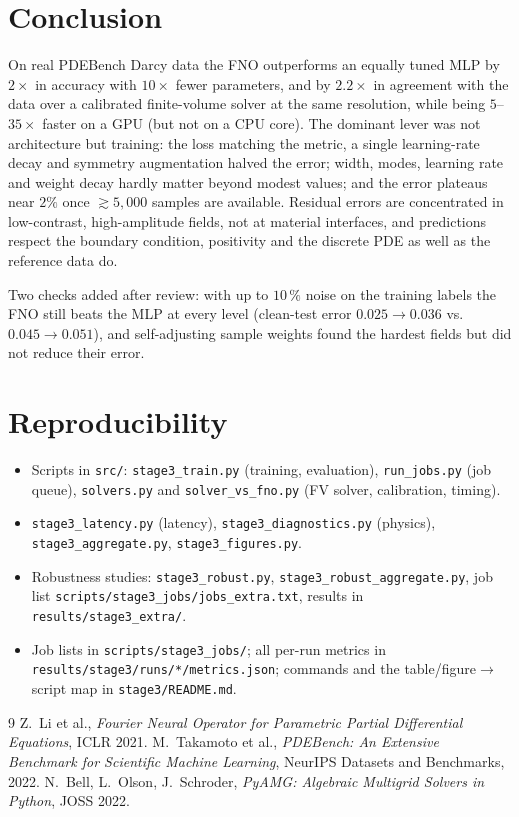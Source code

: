 \documentclass[11pt,a4paper]{article}
\begin{document}
\section{Conclusion}
On real PDEBench Darcy data the FNO outperforms an equally tuned MLP by $2\times$ in accuracy with $10\times$ fewer parameters, and by $2.2\times$ in agreement with the data over a calibrated finite-volume solver at the same resolution, while being $5$--$35\times$ faster on a GPU (but not on a CPU core). The dominant lever was not architecture but training: the loss matching the metric, a single learning-rate decay and symmetry augmentation halved the error; width, modes, learning rate and weight decay hardly matter beyond modest values; and the error plateaus near $2\%$ once $\gtrsim5{,}000$ samples are available. Residual errors are concentrated in low-contrast, high-amplitude fields, not at material interfaces, and predictions respect the boundary condition, positivity and the discrete PDE as well as the reference data do.

Two checks added after review: with up to $10\,\%$ noise on the training labels the FNO still beats the MLP at every level (clean-test error $0.025\to0.036$ vs.\ $0.045\to0.051$), and self-adjusting sample weights found the hardest fields but did not reduce their error.

\section*{Reproducibility}
\begin{itemize}
\item Scripts in \texttt{src/}: \texttt{stage3\_train.py} (training, evaluation), \texttt{run\_jobs.py} (job queue), \texttt{solvers.py} and \texttt{solver\_vs\_fno.py} (FV solver, calibration, timing).
\item \texttt{stage3\_latency.py} (latency), \texttt{stage3\_diagnostics.py} (physics), \texttt{stage3\_aggregate.py}, \texttt{stage3\_figures.py}.
\item Robustness studies: \texttt{stage3\_robust.py}, \texttt{stage3\_robust\_aggregate.py}, job list \texttt{scripts/stage3\_jobs/jobs\_extra.txt}, results in \texttt{results/stage3\_extra/}.
\item Job lists in \texttt{scripts/stage3\_jobs/}; all per-run metrics in \texttt{results/stage3/runs/*/metrics.json}; commands and the table/figure$\to$script map in \texttt{stage3/README.md}.
\end{itemize}

\begin{thebibliography}{9}
 Z.\ Li et al., \emph{Fourier Neural Operator for Parametric Partial Differential Equations}, ICLR 2021.
 M.\ Takamoto et al., \emph{PDEBench: An Extensive Benchmark for Scientific Machine Learning}, NeurIPS Datasets and Benchmarks, 2022.
 N.\ Bell, L.\ Olson, J.\ Schroder, \emph{PyAMG: Algebraic Multigrid Solvers in Python}, JOSS 2022.
\end{thebibliography}
\end{document}
